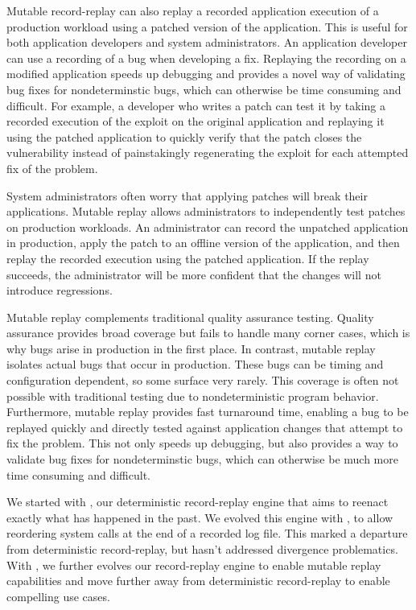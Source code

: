Mutable record-replay can also replay a recorded
application execution of a production workload using
a patched version of the application. This is
useful for both application developers and system administrators.
An application developer can use a recording of a bug when developing
a fix. Replaying the recording on a modified application speeds up
debugging and provides a novel way of validating
bug fixes for nondeterminstic bugs, which can otherwise be time
consuming and difficult.
For example, a developer who writes a patch
can test it by taking a recorded execution of the exploit on the
original application and replaying it using the patched application to
quickly verify that the patch closes the vulnerability instead of
painstakingly regenerating the exploit for each attempted fix
of the problem.

System administrators often worry that applying patches
will break their applications.  Mutable replay allows administrators
to independently test patches on production workloads.  An
administrator can record the unpatched application in production,
apply the patch to an offline version of the application, and then replay
the recorded execution using the patched application.  If the
replay succeeds, the administrator will be more confident that
the changes will not introduce regressions.

Mutable replay complements traditional quality assurance
testing.  Quality assurance provides broad coverage but fails to
handle many corner cases, which is why bugs arise in production in the
first place.  In contrast, mutable replay isolates
actual bugs that occur in production. These bugs can be timing and
configuration dependent, so some surface very rarely. This coverage is often
not possible with traditional testing
due to nondeterministic program behavior.  Furthermore, mutable replay
provides fast turnaround time, enabling a bug to be replayed quickly
and directly tested against application changes that attempt to fix
the problem.
This not only speeds up debugging, but also provides a
way to validate bug fixes for nondeterminstic bugs, which can
otherwise be much more time consuming and difficult.

We started with \scribe, our deterministic record-replay engine that
aims to reenact exactly what has happened in the past. We evolved
this engine with \racepro, to allow reordering system calls
at the end of a recorded log file. This marked a departure from deterministic
record-replay, but hasn't addressed divergence problematics.
With \dora, we further evolves our record-replay engine to enable
mutable replay capabilities and move further away from deterministic
record-replay to enable compelling use cases.


